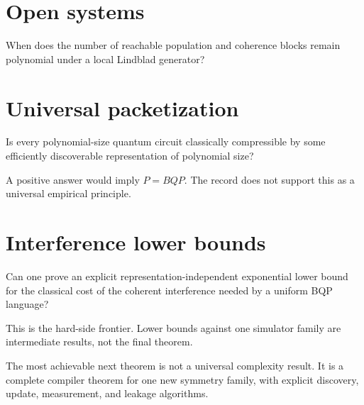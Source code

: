 \section{Open systems}
\begin{question}
When does the number of reachable population and coherence blocks remain polynomial under a local Lindblad generator?
\end{question}

\section{Universal packetization}
\begin{question}
Is every polynomial-size quantum circuit classically compressible by some efficiently discoverable representation of polynomial size?
\end{question}
A positive answer would imply $P=BQP$. The record does not support this as a universal empirical principle.

\section{Interference lower bounds}
\begin{question}
Can one prove an explicit representation-independent exponential lower bound for the classical cost of the coherent interference needed by a uniform BQP language?
\end{question}
This is the hard-side frontier. Lower bounds against one simulator family are intermediate results, not the final theorem.

\begin{frontierbox}
The most achievable next theorem is not a universal complexity result. It is a complete compiler theorem for one new symmetry family, with explicit discovery, update, measurement, and leakage algorithms.
\end{frontierbox}
